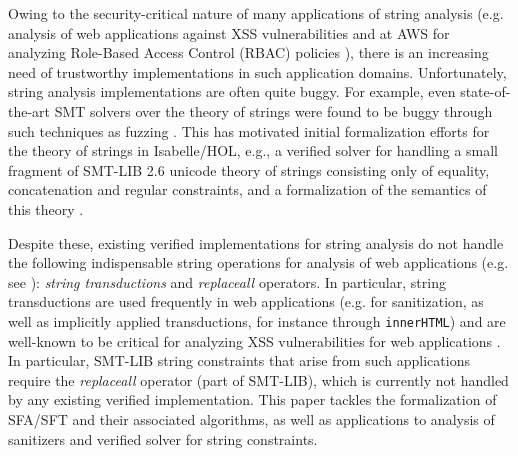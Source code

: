 Owing to the security-critical nature of many applications of string analysis
(e.g. analysis of web applications against XSS vulnerabilities
\cite{Berkeley-JavaScript} and
at AWS for analyzing Role-Based 
Access Control (RBAC) policies \cite{neha,DBLP:conf/fmcad/BackesBCDGLRTV18}), 
there is an 
increasing need of trustworthy implementations in such application domains. 
Unfortunately, string analysis implementations are often quite buggy. For
example, even state-of-the-art SMT solvers over the theory of strings 
were found to be buggy through such techniques as fuzzing
\cite{DBLP:conf/cav/BlotskyMBZKG18,BM20,Mansur20}. 
This
has motivated initial formalization efforts for the theory of strings in 
Isabelle/HOL, e.g., a verified solver \cite{cpp/KanLRS22}
for handling a small fragment of SMT-LIB 2.6 unicode theory of strings
consisting only of equality, concatenation and regular constraints, and a
formalization of the semantics of this theory \cite{verified-verifying}.

Despite these, existing verified implementations for string analysis do not
handle the following indispensable string operations for analysis of web
applications (e.g. see
\cite{DBLP:conf/popl/LinB16,Kern,Berkeley-JavaScript,systematic-transduction,uss/HooimeijerLMSV11}):
\emph{string transductions} and \emph{replaceall} operators. In particular, 
string transductions are used frequently in web applications (e.g. for
sanitization, as well as implicitly applied transductions, for instance
through \texttt{innerHTML}) and are well-known to be critical for analyzing XSS
vulnerabilities for web applications
\cite{Berkeley-JavaScript,systematic-transduction,Kern,uss/HooimeijerLMSV11,DBLP:conf/popl/LinB16}. In particular, SMT-LIB string constraints that 
arise from such applications require the \emph{replaceall} operator (part of
SMT-LIB), which is currently not handled by any existing verified
implementation. This paper tackles the formalization of SFA/SFT and
their associated algorithms, as well as applications to analysis of sanitizers
and verified solver for string constraints. 



